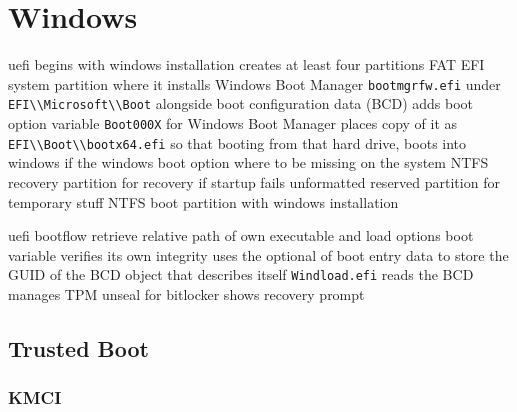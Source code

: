 
\section{Windows}

uefi begins with windows installation
creates at least four partitions
FAT EFI system partition
where it installs Windows Boot Manager \lstinline{bootmgrfw.efi} under \lstinline{EFI\\Microsoft\\Boot} alongside boot configuration data (BCD)
adds boot option variable \lstinline{Boot000X} for Windows Boot Manager
places copy of it as \lstinline{EFI\\Boot\\bootx64.efi} so that booting from that hard drive, boots into windows if the windows boot option where to be missing on the system
NTFS recovery partition for recovery if startup fails
unformatted reserved partition for temporary stuff
NTFS boot partition with windows installation
\cite[12. The UEFI boot]{windows-internals-7-part2}

uefi bootflow
retrieve relative path of own executable and load options boot variable
verifies its own integrity
uses the optional of boot entry data to store the GUID of the BCD object that describes itself
\cite[12. The Windows Boot Manager]{windows-internals-7-part2}
\lstinline{Windload.efi}
reads the BCD
manages TPM unseal for bitlocker
shows recovery prompt



\subsection{Trusted Boot}
\subsubsection{KMCI}
